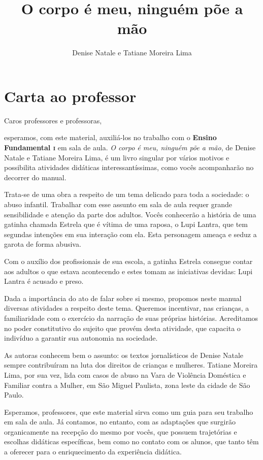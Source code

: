 \documentclass[11pt]{extarticle}
\newcommand{\AutorLivro}{Denise Natale e Tatiane Moreira Lima}
\newcommand{\TituloLivro}{O corpo é meu, ninguém põe a mão}
\newcommand{\colaborador}{Renier Silva}
\begin{document}
\title{\TituloLivro}
\author{\AutorLivro}
\def\authornotes{\colaborador}

\date{}
\maketitle

\tableofcontents

\section{Carta ao professor}

Caros professores e professoras,

esperamos, com este material,
auxiliá-los no trabalho com o \textbf{Ensino Fundamental \textsc{i}} em 
sala de aula. \textit{O corpo é meu, ninguém põe a mão}, de Denise Natale e Tatiane Moreira Lima, é um livro singular
por vários motivos e possibilita atividades didáticas interessantíssimas,
como vocês acompanharão no decorrer do manual.

Trata-se de uma obra a respeito de um tema delicado para toda a sociedade: o abuso infantil. 
Trabalhar com esse assunto em sala de aula requer grande sensibilidade e atenção da parte dos adultos. 
Vocês conhecerão a história de uma gatinha chamada Estrela que é vítima de uma raposa, o Lupi Lantra,
que tem segundas intenções em sua interação com ela. Esta personagem ameaça e seduz a garota de forma  abusiva. 

Com o auxílio dos profissionais de sua escola, a gatinha Estrela consegue 
contar aos adultos o que estava acontecendo e estes tomam as iniciativas
devidas: Lupi Lantra é acusado e preso. 

Dada a importância do ato de falar sobre si mesmo, propomos neste manual diversas atividades a respeito deste tema. Queremos incentivar, nas crianças, a familiaridade com o exercício da 
narração de suas próprias histórias. Acreditamos no poder constitutivo do sujeito
que provém desta atividade, que capacita o indivíduo a garantir sua autonomia 
na sociedade.

As autoras conhecem bem o assunto: os textos jornalísticos de Denise Natale sempre contribuíram na luta dos direitos de crianças e mulheres. Tatiane Moreira Lima, por sua vez, lida com casos de abuso na Vara de Violência Doméstica e Familiar contra a Mulher, 
em São Miguel Paulista, zona leste da cidade de São Paulo.

Esperamos, professores, que este material sirva como um guia 
para seu trabalho em sala de aula. Já contamos, no entanto, com as adaptações
que surgirão organicamente na recepção do mesmo por vocês, que possuem 
trajetórias e escolhas didáticas específicas, bem como no contato com os 
alunos, que tanto têm a oferecer para o enriquecimento da experiência didática.
\end{document}
